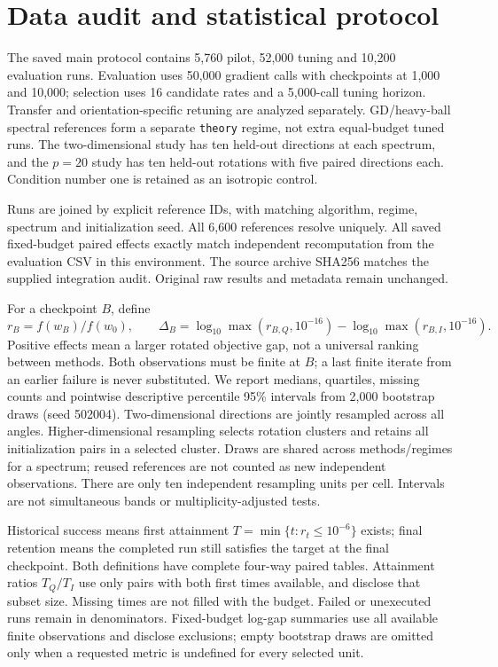 \documentclass[10pt,a4paper]{article}
\begin{document}
\section{Data audit and statistical protocol}
The saved main protocol contains 5,760 pilot, 52,000 tuning and 10,200 evaluation
runs. Evaluation uses 50,000 gradient calls with checkpoints at 1,000 and 10,000;
selection uses 16 candidate rates and a 5,000-call tuning horizon. Transfer and
orientation-specific retuning are analyzed separately. GD/heavy-ball spectral
references form a separate \texttt{theory} regime, not extra equal-budget tuned runs.
The two-dimensional study has ten held-out directions at each spectrum,
and the $p=20$ study has ten held-out rotations with five paired directions each.
Condition number one is retained as an isotropic control.

Runs are joined by explicit reference IDs, with matching algorithm, regime,
spectrum and initialization seed. All 6,600 references resolve uniquely.
All saved fixed-budget paired effects exactly match independent recomputation
from the evaluation CSV in this environment. The source archive SHA256 matches
the supplied integration audit. Original raw results and metadata remain unchanged.

For a checkpoint $B$, define
\[
 r_B=f(w_B)/f(w_0),\qquad
 \Delta_B=\log_{10}\max(r_{B,Q},10^{-16})-
           \log_{10}\max(r_{B,I},10^{-16}).
\]
Positive effects mean a larger rotated objective gap, not a universal ranking
between methods. Both observations must be finite at $B$; a last finite iterate
from an earlier failure is never substituted. We report medians, quartiles,
missing counts and pointwise descriptive percentile 95\% intervals from 2,000
bootstrap draws (seed 502004). Two-dimensional directions are jointly resampled
across all angles. Higher-dimensional resampling selects rotation clusters and
retains all initialization pairs in a selected cluster. Draws are shared across
methods/regimes for a spectrum; reused references are not counted as new
independent observations. There are only ten independent resampling units per
cell. Intervals are not simultaneous bands or multiplicity-adjusted tests.

Historical success means first attainment $T=\min\{t:r_t\le10^{-6}\}$ exists;
final retention means the completed run still satisfies the target at the final
checkpoint. Both definitions have complete four-way paired tables. Attainment
ratios $T_Q/T_I$ use only pairs with both first times available, and disclose that
subset size. Missing times are not filled with the budget. Failed or unexecuted
runs remain in denominators. Fixed-budget log-gap summaries use all available
finite observations and disclose exclusions; empty bootstrap draws are omitted
only when a requested metric is undefined for every selected unit.
\end{document}
